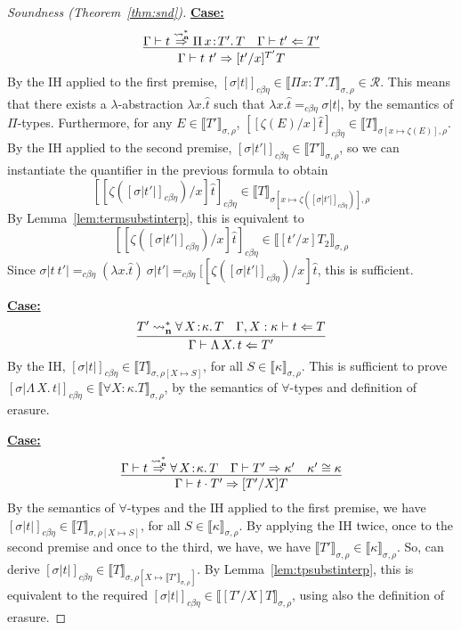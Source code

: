 \documentclass{article}
\newcommand{\choice}[0]{\zeta}
\newcommand{\abs}[4]{{#1}\, #2\! : \! #3.\, #4}
\newcommand{\absu}[3]{{#1}\, #2.\, #3}
\newcommand{\interp}[1]{\llbracket #1 \rrbracket}
\newcommand{\leadstocs}[0]{\ensuremath{\leadsto_{\mathbf{n}}^*}}
\newcommand{\tpcheck}[0]{\Leftarrow}
\newcommand{\tpsynth}[0]{\Rightarrow}
\newcommand{\tpsynthleads}[0]{\ensuremath{\overset{\leadstocs}{\Rightarrow}}}
\newcommand{\cbe}[0]{c\beta\eta}
\newcommand{\startcase}[1]{\vspace{#1} \noindent\textbf{\underline{Case:}}}
\begin{document}
\begin{proof}[Soundness (Theorem~\ref{thm:snd})]
\startcase{.2cm}
\[
  \infer{\Gamma\vdash t\ t' \tpsynth [t'/x]^{T'}T}{\Gamma\vdash t \tpsynthleads \abs{\Pi}{x}{T'}{T} & \Gamma\vdash t' \tpcheck T'} \\ \\
\]
By the IH applied to the first premise, $[\sigma
|t|]_{\cbe}\in\interp{\Pi x:T'.T}_{\sigma,\rho}\in\mathcal{R}$.  This
means that there exists a $\lambda$-abstraction $\lambda x.\hat{t}$
such that $\lambda x.\hat{t} =_{\cbe} \sigma |t|$, by the semantics of $\Pi$-types.
Furthermore, for any $E\in\interp{T'}_{\sigma,\rho}$,
$[[\choice(E)/x]\hat{t}]_{\cbe}\in\interp{T}_{\sigma[x\mapsto\choice(E)],\rho}$.
By the IH applied to the second premise, $[\sigma |t'|]_{\cbe}\in\interp{T'}_{\sigma,\rho}$,
so we can instantiate the quantifier in the previous formula to obtain
\[
 [[\choice([\sigma |t'|]_{\cbe})/x]\hat{t}]_{\cbe}\in\interp{T}_{\sigma[x\mapsto\choice([\sigma |t'|]_{\cbe})],\rho}
\]
By Lemma~\ref{lem:termsubstinterp}, this is equivalent to
\[
 [[\choice([\sigma |t'|]_{\cbe})/x]\hat{t}]_{\cbe}\in\interp{[t'/x]T_2}_{\sigma,\rho}
\]
Since $\sigma |t\ t'| =_{\cbe} (\lambda x.\hat{t})\ \sigma |t'| =_{\cbe} [[\choice([\sigma |t'|]_{\cbe})/x]\hat{t}$,
this is sufficient.

\startcase{.2cm}
\[
  \infer{\Gamma\vdash \absu{\Lambda}{X}{t} \tpcheck T'}
  {T' \leadstocs \abs{\forall}{X}{\kappa}{T} & \Gamma,X:\kappa\vdash t \tpcheck T}
\]
By the IH, $[\sigma |t|]_{\cbe}\in\interp{T}_{\sigma,\rho[X\mapsto S]}$, for all $S\in\interp{\kappa}_{\sigma,\rho}$.
This is sufficient to prove $[\sigma |\absu{\Lambda}{X}{t}|]_{\cbe}\in\interp{\forall X:\kappa.T}_{\sigma,\rho}$, by the semantics
of $\forall$-types and definition of erasure.

\startcase{.2cm}
\[
  \infer{\Gamma\vdash t \cdot T' \tpsynth [T'/X]T}
  {\Gamma\vdash t \tpsynthleads \abs{\forall}{X}{\kappa}{T} & \Gamma\vdash T' \tpsynth \kappa' & \kappa'\cong\kappa} \\ \\
\]
By the semantics of $\forall$-types and the IH applied to the first
premise, we have $[\sigma |t|]_{\cbe}\in\interp{T}_{\sigma,\rho[X\mapsto
  S]}$, for all $S\in\interp{\kappa}_{\sigma,\rho}$.
By applying the IH twice, once to the second premise and once to the third, we
have, we have \(\interp{T'}_{\sigma,\rho} \in \interp{\kappa}_{\sigma,\rho}\).
So, can derive $[\sigma |t|]_{\cbe}\in\interp{T}_{\sigma,\rho[X\mapsto \interp{T'}_{\sigma,\rho}]}$.
By Lemma~\ref{lem:tpsubstinterp},
this is equivalent to the required $[\sigma |t|]_{\cbe}\in\interp{[T'/X]T}_{\sigma,\rho}$,
using also the definition of erasure.


\end{proof}
\end{document}
